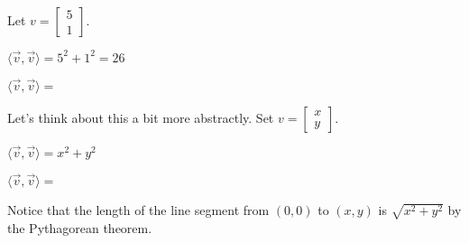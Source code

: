 \documentclass{ximera}
\begin{document}
\begin{question}
  Let $v  = \begin{bmatrix}  5  \\ 1\end{bmatrix}$.   
	
  \begin{solution}
    \begin{hint}
      $\langle \vec{v},\vec{v} \rangle = 5^2+1^2 = 26$
    \end{hint}
    $\langle \vec{v},\vec{v} \rangle = $ 
  \end{solution}

  Let's think about this a bit more abstractly.
  Set $v  = \begin{bmatrix}  x  \\ y\end{bmatrix}$. 
	
  \begin{solution}
    \begin{hint}
      $\langle \vec{v},\vec{v} \rangle = x^2+y^2$
    \end{hint}
    $\langle \vec{v},\vec{v} \rangle = $     
    
  \end{solution}
  
  Notice that the length of the line segment from $(0,0)$ to $(x,y)$ is $\sqrt{x^2+y^2}$ by the Pythagorean theorem.
	
\end{question}
\end{document}
